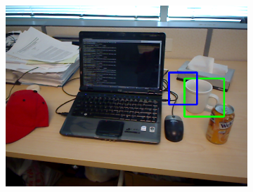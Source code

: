 \begin{figure}
\begin{subfigure}[b]{0.3\textwidth}
		\includegraphics[width=\textwidth]{img/seguimiento_frame_template/frame_template-desk_1-coffee_mug_5-frame_28.png}
	\end{subfigure}
	

\end{figure}

